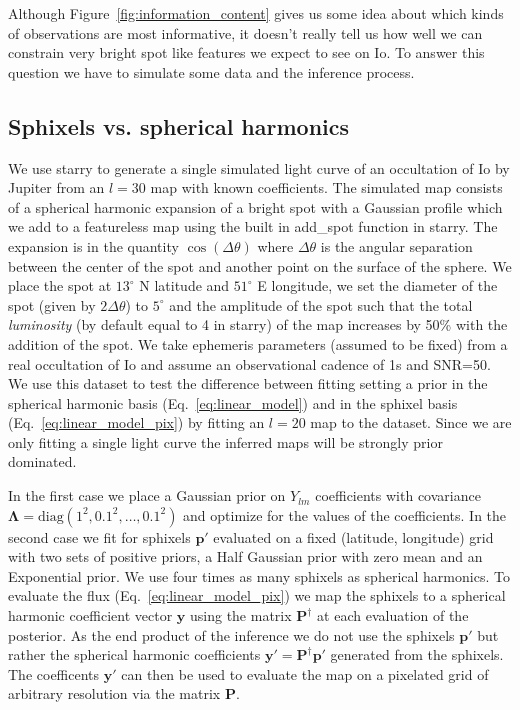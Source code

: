 \documentclass[modern]{aastex62}
\begin{document}
Although Figure~\ref{fig:information_content} gives us some idea about which kinds of observations are most informative, it doesn't really tell us how well we can constrain very bright spot like features we expect to see on Io.
To answer this question we have to simulate some data and the inference process.

\subsection{Sphixels vs. spherical harmonics}
\label{ssec:sphixels_vs_harmonics}
We use \textsf{starry} to generate a single simulated light curve of an occultation of Io by Jupiter from an $l=30$ map with known coefficients.
The simulated map consists of a spherical harmonic expansion of a bright spot with a Gaussian profile which we add to a featureless map using the built in \textsf{add\_spot} function in \textsf{starry}.
The expansion is in the quantity $\cos(\Delta\theta)$ where $\Delta\theta$ is the angular separation between the center of the spot and another point on the surface of the sphere. 
We place the spot at $13^\circ$ N latitude and $51^\circ$ E longitude, we set the diameter of the spot (given by  $2\Delta\theta$) to $5^\circ$ and the amplitude of the spot such that the total \emph{luminosity} (by default equal to 4 in \textsf{starry}) of the map increases by 50\% with the addition of the spot.
We take ephemeris parameters (assumed to be fixed) from a real occultation of Io and assume an observational cadence of 1s and SNR=50.
We use this dataset to test the difference between fitting setting a prior in the spherical harmonic basis (Eq.~\ref{eq:linear_model}) and in the sphixel basis (Eq.~\ref{eq:linear_model_pix}) by fitting an $l=20$ map to the dataset.
Since we are only fitting a single light curve the inferred maps will be strongly prior dominated.

In the first case we place a Gaussian prior on $Y_{lm}$ coefficients with covariance $\boldsymbol{\Lambda}=\mathrm{diag}(1^2,0.1^2,\dots,0.1^2)$ and optimize for the values of the coefficients.
In the second case we fit for sphixels $\mathbf{p}'$ evaluated on a fixed (latitude, longitude) grid with two sets of positive priors, a Half Gaussian prior with zero mean and an Exponential prior.
We use four times as many sphixels as spherical harmonics.
To evaluate the flux (Eq.~\ref{eq:linear_model_pix}) we map the sphixels to a spherical harmonic coefficient vector $\mathbf{y}$ using the matrix $\mathbf{P}^\dagger$ at each evaluation of the posterior.
As the end product of the inference we do not use the sphixels $\mathbf{p}'$ but rather the spherical harmonic coefficients $\mathbf{y}'=\mathbf{P}^\dagger\mathbf{p}'$ generated from the sphixels.
The coefficents $\mathbf{y}'$ can then be used to evaluate the map on a pixelated grid of arbitrary resolution via the matrix $\mathbf{P}$. 
\end{document}
